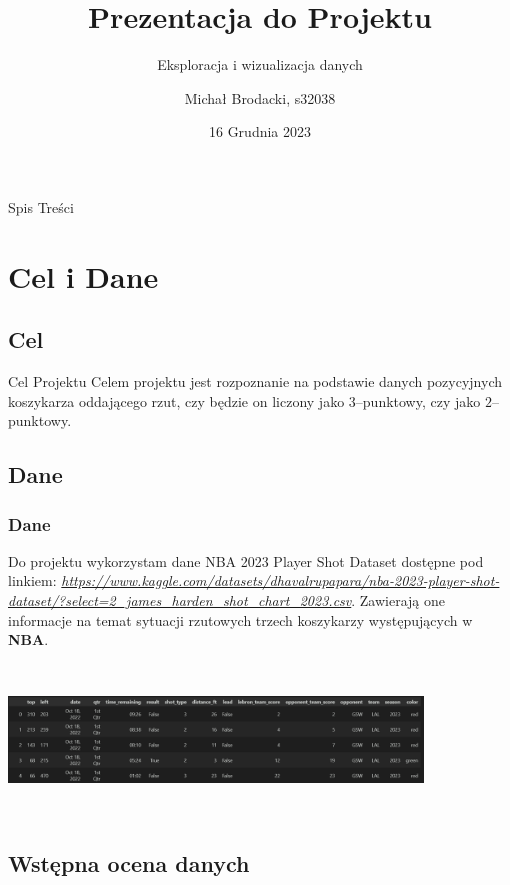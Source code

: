 \documentclass{beamer}
\title{Prezentacja do Projektu}
\subtitle{Eksploracja i wizualizacja danych}
\author{Michał Brodacki, s32038}
\institute{Polsko--Japońska Akademia Technik Komputerowych}
\date{16 Grudnia 2023}
\begin{document}
	\begin{frame}
		\titlepage
	\end{frame}
	\begin{frame}{Spis Treści}
		\tableofcontents %
	\end{frame}
	
	\section{Cel i Dane}
	\subsection{Cel}
	\begin{frame}
		\begin{block}{Cel Projektu}
		Celem projektu jest rozpoznanie na podstawie danych pozycyjnych koszykarza oddającego rzut, czy będzie on liczony jako $3$--punktowy, czy jako $2$--punktowy.
		\end{block}

	\end{frame}
	\subsection{Dane}
\begin{frame}
	\frametitle{Dane}
Do projektu wykorzystam dane NBA 2023 Player Shot Dataset dostępne pod linkiem: 
\textit{\url{https://www.kaggle.com/datasets/dhavalrupapara/nba-2023-player-shot-dataset/?select=2_james_harden_shot_chart_2023.csv}}. Zawierają one informacje na temat sytuacji rzutowych trzech koszykarzy występujących w \textbf{NBA}.
\end{frame}
\begin{frame}
	\begin{center}
		\includegraphics[width=11cm, height=4cm]{dane.png}
	\end{center}
\end{frame}
	\subsection{Wstępna ocena danych}
\end{document}
